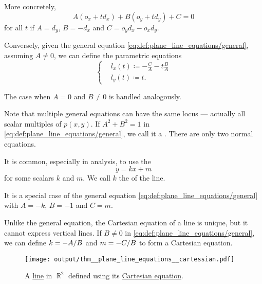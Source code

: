 \begin{definition}
\begin{thmenum}
    More concretely,
    \begin{equation*}
      A(o_x + td_x) + B(o_y + td_y) + C = 0
    \end{equation*}
    for all \( t \) if \( A = d_y \), \( B = -d_x \) and \( C = o_y d_x - o_x d_y \).

    Conversely, given the general equation \eqref{eq:def:plane_line_equations/general}, assuming \( A \neq 0 \), we can define the parametric equations
    \begin{equation*}
      \begin{cases}
        &l_x(t) \coloneqq -\tfrac C A - t \tfrac B A  \\
        &l_y(t) \coloneqq t.
      \end{cases}
    \end{equation*}

    The case when \( A = 0 \) and \( B \neq 0 \) is handled analogously.

    Note that multiple general equations can have the same locus --- actually all scalar multiples of \( p(x, y) \). If \( A^2 + B^2 = 1 \) in \eqref{eq:def:plane_line_equations/general}, we call it a . There are only two normal equations.

     It is common, especially in analysis, to use the 
    \begin{equation}\label{eq:def:plane_line_equations/cartesian}
      y = kx + m
    \end{equation}
    for some scalars \( k \) and \( m \). We call \( k \) the  of the line.

    It is a special case of the general equation \eqref{eq:def:plane_line_equations/general} with \( A = -k \), \( B = -1 \) and \( C = m \).

    Unlike the general equation, the Cartesian equation of a line is unique, but it cannot express vertical lines. If \( B \neq 0 \) in \eqref{eq:def:plane_line_equations/general}, we can define \( k = -\ifrac A B \) and \( m = -\ifrac C B \) to form a Cartesian equation.

    \begin{figure}[!ht]
      \centering
      \texttt{[image: output/thm\_\_plane\_line\_equations\_\_cartessian.pdf]}
      \caption{A \hyperref[def:affine_line]{line} in \( \BbbR^2 \) defined using its \hyperref[def:plane_line_equations/cartesian]{Cartesian equation}.}\label{fig:def:plane_line_equations/cartesian_drawing}
    \end{figure}


\end{thmenum}
\end{definition}
